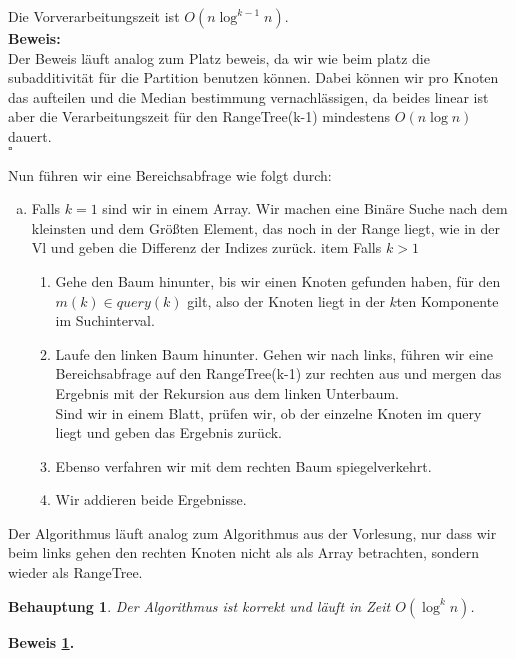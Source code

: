 \documentclass[11pt,a4paper,ngerman]{article}
\newtheorem{lemma}{\bfseries Behauptung}
\begin{document}
Die Vorverarbeitungszeit ist $O(n \log^{k-1} n)$.\\
\textbf{Beweis:}\\
    Der Beweis läuft analog zum Platz beweis, da wir wie beim platz die subadditivität für
    die Partition benutzen können.
    Dabei können wir pro Knoten das aufteilen und die Median bestimmung vernachlässigen,
    da beides linear ist aber die Verarbeitungszeit für den RangeTree(k-1) mindestens $O(n \log n)$
    dauert.\\
\mbox{}\hfill$\square$

Nun führen wir eine Bereichsabfrage wie folgt durch:
\begin{enumerate}[a.]
    \item Falls $k=1$ sind wir in einem Array. Wir machen eine Binäre Suche nach dem kleinsten
        und dem Größten Element, das noch in der Range liegt, wie in der Vl und geben
        die Differenz der Indizes zurück.
    item Falls $k>1$
\begin{enumerate}[1.]
    \item Gehe den Baum hinunter, bis wir einen Knoten gefunden haben, für den $m(k) \in query(k)$ gilt,
        also der Knoten liegt in der $k$ten Komponente im Suchinterval.
    \item Laufe den linken Baum hinunter. Gehen wir nach links, führen wir eine Bereichsabfrage auf
        den RangeTree(k-1) zur rechten aus und mergen das Ergebnis mit der Rekursion aus dem linken Unterbaum.\\
        Sind wir in einem Blatt, prüfen wir, ob der einzelne Knoten im query liegt und geben das Ergebnis zurück.
    \item Ebenso verfahren wir mit dem rechten Baum spiegelverkehrt.
    \item Wir addieren beide Ergebnisse.
\end{enumerate}
\end{enumerate}

Der Algorithmus läuft analog zum Algorithmus aus der Vorlesung, nur dass wir beim links gehen den rechten Knoten
nicht als als Array betrachten, sondern wieder als RangeTree.

\begin{lemma}\label{alge:ueb10:rangetreecor}
    Der Algorithmus ist korrekt und läuft in Zeit $O(\log^{k} n)$.
\end{lemma}

\textbf{Beweis \ref{alge:ueb10:rangetreecor}.}\\
\end{document}
